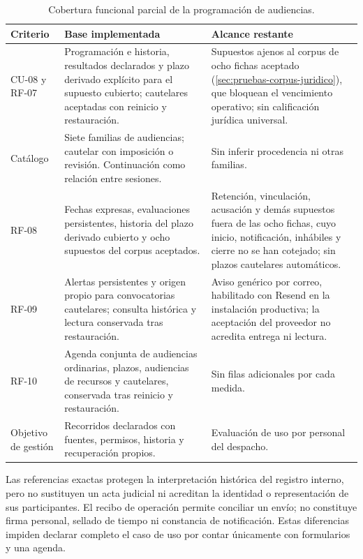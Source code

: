 \begin{table}[tbp]
  \centering
  \caption{Cobertura funcional parcial de la programación de audiencias.}
  \label{tab:matriz-alcance-audiencias}
  \begin{tabularx}{\linewidth}{@{}L{2.6cm} >{\raggedright\arraybackslash}X >{\raggedright\arraybackslash}X@{}}
    \toprule
    \textbf{Criterio} & \textbf{Base implementada} & \textbf{Alcance restante} \\
    \midrule
    CU-08 y RF-07 & Programaci\'on e historia, resultados declarados y plazo derivado expl\'icito para el supuesto cubierto; cautelares aceptadas con reinicio y restauraci\'on. & Supuestos ajenos al corpus de ocho fichas aceptado (\cref{sec:pruebas-corpus-juridico}), que bloquean el vencimiento operativo; sin calificaci\'on jur\'idica universal. \\
    Cat\'alogo & Siete familias de audiencias; cautelar con imposici\'on o revisi\'on. Continuaci\'on como relaci\'on entre sesiones. & Sin inferir procedencia ni otras familias. \\
    RF-08 & Fechas expresas, evaluaciones persistentes, historia del plazo derivado cubierto y ocho supuestos del corpus aceptados. & Retenci\'on, vinculaci\'on, acusaci\'on y dem\'as supuestos fuera de las ocho fichas, cuyo inicio, notificaci\'on, inh\'abiles y cierre no se han cotejado; sin plazos cautelares autom\'aticos. \\
    RF-09 & Alertas persistentes y origen propio para convocatorias cautelares; consulta hist\'orica y lectura conservada tras restauraci\'on. & Aviso gen\'erico por correo, habilitado con Resend en la instalaci\'on productiva; la aceptaci\'on del proveedor no acredita entrega ni lectura. \\
    RF-10 & Agenda conjunta de audiencias ordinarias, plazos, audiencias de recursos y cautelares, conservada tras reinicio y restauraci\'on. & Sin filas adicionales por cada medida. \\
    Objetivo de gesti\'on & Recorridos declarados con fuentes, permisos, historia y recuperaci\'on propios. & Evaluaci\'on de uso por personal del despacho. \\
    \bottomrule
  \end{tabularx}
\end{table}

Las referencias exactas protegen la interpretación histórica del registro interno, pero no sustituyen un acta judicial ni acreditan la identidad o representación de sus participantes. El recibo de operación permite conciliar un envío; no constituye firma personal, sellado de tiempo ni constancia de notificación. Estas diferencias impiden declarar completo el caso de uso por contar únicamente con formularios y una agenda.

